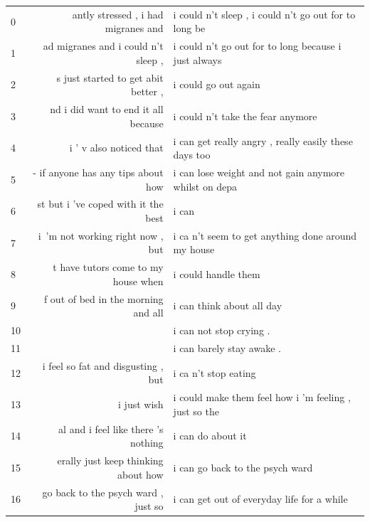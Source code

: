 \begin{table}[htb]
    \footnotesize
    \begin{tabular}{lrl}
    \toprule
    0  &  antly stressed , i had migranes and &  i could n't sleep , i could n't go out for to long be\\
    1  &  ad migranes and i could n't sleep , &  i could n't go out for to long because i just always \\
    2  &  s just started to get abit better , &  i could go out again                                 \\
    3  &  nd i did want to end it all because &  i could n't take the fear anymore                    \\
    4  &              i ' v also noticed that &  i can get really angry , really easily these days too\\
    5  &   - if anyone has any tips about how &  i can lose weight and not gain anymore whilst on depa\\
    6  &  st but i 've coped with it the best &  i can                                                \\
    7  &     i~'m not working right now , but &  i ca n't seem to get anything done around my house   \\
    8  &  t have tutors come to my house when &  i could handle them                                  \\
    9  &  f out of bed in the morning and all &  i can think about all day                            \\
    10 &                                      &  i can not stop crying .                              \\
    11 &                                      &  i can barely stay awake .                            \\
    12 &   i feel so fat and disgusting , but &  i ca n't stop eating                                 \\
    13 &                          i just wish &  i could make them feel how i 'm feeling , just so the\\
    14 &  al and i feel like there 's nothing &  i can do about it                                    \\
    15 &  erally just keep thinking about how &  i can go back to the psych ward                      \\
    16 &  go back to the psych ward , just so &  i can get out of everyday life for a while           \\

\end{tabular}
\end{table}
